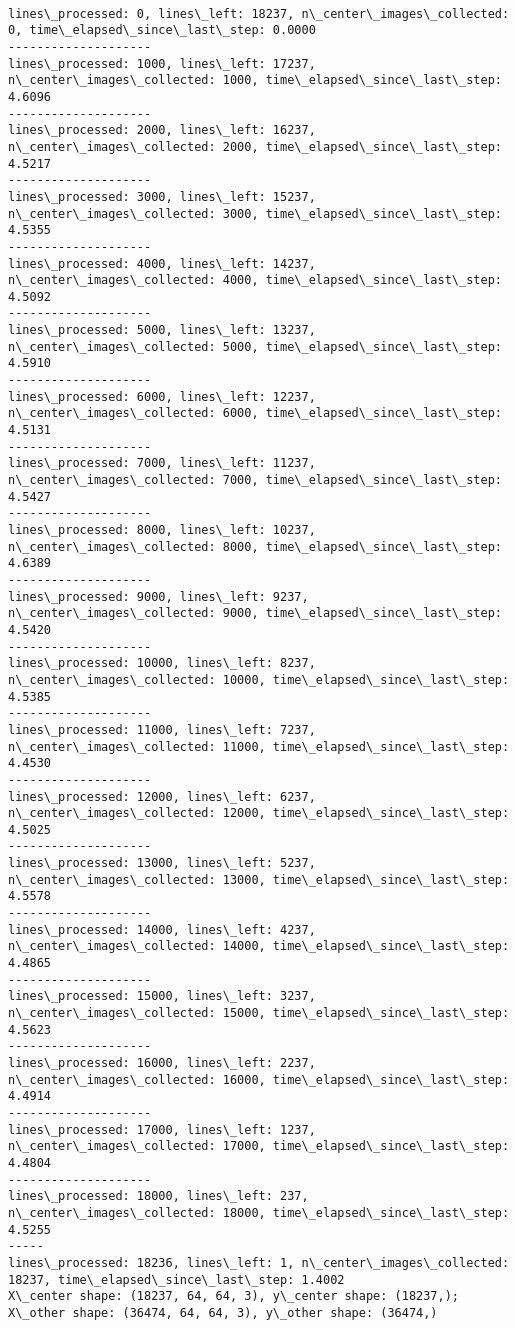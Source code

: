 \documentclass[11pt]{article}
\begin{document}
    \begin{Verbatim}[commandchars=\\\{\}]

lines\_processed: 0, lines\_left: 18237, n\_center\_images\_collected: 0, time\_elapsed\_since\_last\_step: 0.0000
--------------------
lines\_processed: 1000, lines\_left: 17237, n\_center\_images\_collected: 1000, time\_elapsed\_since\_last\_step: 4.6096
--------------------
lines\_processed: 2000, lines\_left: 16237, n\_center\_images\_collected: 2000, time\_elapsed\_since\_last\_step: 4.5217
--------------------
lines\_processed: 3000, lines\_left: 15237, n\_center\_images\_collected: 3000, time\_elapsed\_since\_last\_step: 4.5355
--------------------
lines\_processed: 4000, lines\_left: 14237, n\_center\_images\_collected: 4000, time\_elapsed\_since\_last\_step: 4.5092
--------------------
lines\_processed: 5000, lines\_left: 13237, n\_center\_images\_collected: 5000, time\_elapsed\_since\_last\_step: 4.5910
--------------------
lines\_processed: 6000, lines\_left: 12237, n\_center\_images\_collected: 6000, time\_elapsed\_since\_last\_step: 4.5131
--------------------
lines\_processed: 7000, lines\_left: 11237, n\_center\_images\_collected: 7000, time\_elapsed\_since\_last\_step: 4.5427
--------------------
lines\_processed: 8000, lines\_left: 10237, n\_center\_images\_collected: 8000, time\_elapsed\_since\_last\_step: 4.6389
--------------------
lines\_processed: 9000, lines\_left: 9237, n\_center\_images\_collected: 9000, time\_elapsed\_since\_last\_step: 4.5420
--------------------
lines\_processed: 10000, lines\_left: 8237, n\_center\_images\_collected: 10000, time\_elapsed\_since\_last\_step: 4.5385
--------------------
lines\_processed: 11000, lines\_left: 7237, n\_center\_images\_collected: 11000, time\_elapsed\_since\_last\_step: 4.4530
--------------------
lines\_processed: 12000, lines\_left: 6237, n\_center\_images\_collected: 12000, time\_elapsed\_since\_last\_step: 4.5025
--------------------
lines\_processed: 13000, lines\_left: 5237, n\_center\_images\_collected: 13000, time\_elapsed\_since\_last\_step: 4.5578
--------------------
lines\_processed: 14000, lines\_left: 4237, n\_center\_images\_collected: 14000, time\_elapsed\_since\_last\_step: 4.4865
--------------------
lines\_processed: 15000, lines\_left: 3237, n\_center\_images\_collected: 15000, time\_elapsed\_since\_last\_step: 4.5623
--------------------
lines\_processed: 16000, lines\_left: 2237, n\_center\_images\_collected: 16000, time\_elapsed\_since\_last\_step: 4.4914
--------------------
lines\_processed: 17000, lines\_left: 1237, n\_center\_images\_collected: 17000, time\_elapsed\_since\_last\_step: 4.4804
--------------------
lines\_processed: 18000, lines\_left: 237, n\_center\_images\_collected: 18000, time\_elapsed\_since\_last\_step: 4.5255
-----
lines\_processed: 18236, lines\_left: 1, n\_center\_images\_collected: 18237, time\_elapsed\_since\_last\_step: 1.4002
X\_center shape: (18237, 64, 64, 3), y\_center shape: (18237,); X\_other shape: (36474, 64, 64, 3), y\_other shape: (36474,)

    \end{Verbatim}
\end{document}
